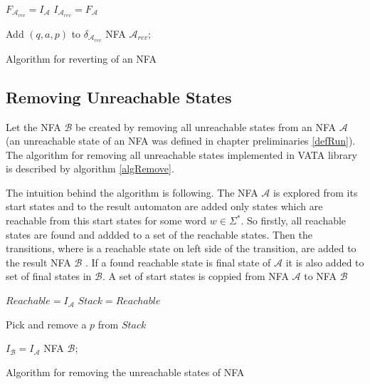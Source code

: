 \begin{algorithm}[H]
	\label{algRev}

  
  $F_{\mathcal{A}_{rev}}=I_\mathcal{A}$\; 
  $I_{\mathcal{A}_{rev}}=F_\mathcal{A}$\;

   {
    Add $(q,a,p)$ to $\delta_{\mathcal{A}_{rev}}$\;
  }
	\Return NFA $\mathcal{A}_{rev}$;
	\caption{Algorithm for reverting of an NFA}
\end{algorithm}

\subsection{Removing Unreachable States}
Let the NFA $\mathcal{B}$ be created by removing all unreachable states from an NFA $\mathcal{A}$ (an unreachable state of an NFA was defined in
chapter preliminaries \ref{defRun}). The algorithm for removing all unreachable states implemented in VATA library is described by algorithm \ref{algRemove}.

The intuition behind the algorithm is following. The NFA $\mathcal{A}$ is explored 
from its start states and to the result automaton are added only states which are
reachable from this start states for some word $w \in \Sigma^{*}$. So firstly, all reachable states are found and addded to a set of the reachable states. 
Then the transitions, where is a reachable state on left side of the transition, are added to the result NFA $\mathcal{B}$ .
If a found reachable state is final state of 
$\mathcal{A}$ it is also added to set of final states in $\mathcal{B}$. A set of start states is coppied from
NFA $\mathcal{A}$ to NFA $\mathcal{B}$
\\

\begin{algorithm}[H]
	\label{algRemove}

  $Reachable = I_\mathcal{A}$\;
  $Stack = Reachable$\;
	
   {
			Pick and remove a $p$ from $Stack$\;
	 }

  $I_{\mathcal{B}} = I_{\mathcal{A}}$\;
		\Return NFA $\mathcal{B}$;
	\caption{Algorithm for removing the unreachable states of NFA}
\end{algorithm}

